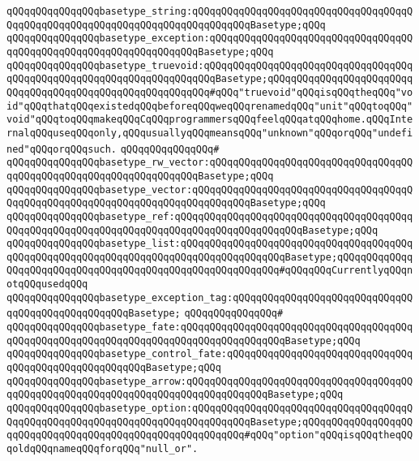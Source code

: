 \verb|qQQqqQQqqQQqqQQqbasetype_string:qQQqqQQqqQQqqQQqqQQqqQQqqQQqqQQqqQQqqQQqqQQqqQQqqQQqqQQqqQQqqQQqqQQqqQQqqQQqqQQqBasetype;qQQq|\newline
\verb|qQQqqQQqqQQqqQQqbasetype_exception:qQQqqQQqqQQqqQQqqQQqqQQqqQQqqQQqqQQqqQQqqQQqqQQqqQQqqQQqqQQqqQQqqQQqBasetype;qQQq|\newline
\verb|qQQqqQQqqQQqqQQqbasetype_truevoid:qQQqqQQqqQQqqQQqqQQqqQQqqQQqqQQqqQQqqQQqqQQqqQQqqQQqqQQqqQQqqQQqqQQqqQQqBasetype;qQQqqQQqqQQqqQQqqQQqqQQqqQQqqQQqqQQqqQQqqQQqqQQqqQQqqQQqqQQq#qQQq"truevoid"qQQqisqQQqtheqQQq"void"qQQqthatqQQqexistedqQQqbeforeqQQqweqQQqrenamedqQQq"unit"qQQqtoqQQq"void"qQQqtoqQQqmakeqQQqCqQQqprogrammersqQQqfeelqQQqatqQQqhome.qQQqInternalqQQquseqQQqonly,qQQqusuallyqQQqmeansqQQq"unknown"qQQqorqQQq"undefined"qQQqorqQQqsuch.|\newline
\verb|qQQqqQQqqQQqqQQq#|\newline
\verb|qQQqqQQqqQQqqQQqbasetype_rw_vector:qQQqqQQqqQQqqQQqqQQqqQQqqQQqqQQqqQQqqQQqqQQqqQQqqQQqqQQqqQQqqQQqqQQqBasetype;qQQq|\newline
\verb|qQQqqQQqqQQqqQQqbasetype_vector:qQQqqQQqqQQqqQQqqQQqqQQqqQQqqQQqqQQqqQQqqQQqqQQqqQQqqQQqqQQqqQQqqQQqqQQqqQQqqQQqBasetype;qQQq|\newline
\verb|qQQqqQQqqQQqqQQqbasetype_ref:qQQqqQQqqQQqqQQqqQQqqQQqqQQqqQQqqQQqqQQqqQQqqQQqqQQqqQQqqQQqqQQqqQQqqQQqqQQqqQQqqQQqqQQqqQQqBasetype;qQQq|\newline
\verb|qQQqqQQqqQQqqQQqbasetype_list:qQQqqQQqqQQqqQQqqQQqqQQqqQQqqQQqqQQqqQQqqQQqqQQqqQQqqQQqqQQqqQQqqQQqqQQqqQQqqQQqqQQqqQQqBasetype;qQQqqQQqqQQqqQQqqQQqqQQqqQQqqQQqqQQqqQQqqQQqqQQqqQQqqQQqqQQq#qQQqqQQqCurrentlyqQQqnotqQQqusedqQQq|\newline
\verb|qQQqqQQqqQQqqQQqbasetype_exception_tag:qQQqqQQqqQQqqQQqqQQqqQQqqQQqqQQqqQQqqQQqqQQqqQQqqQQqBasetype;|\newline
\verb|qQQqqQQqqQQqqQQq#|\newline
\verb|qQQqqQQqqQQqqQQqbasetype_fate:qQQqqQQqqQQqqQQqqQQqqQQqqQQqqQQqqQQqqQQqqQQqqQQqqQQqqQQqqQQqqQQqqQQqqQQqqQQqqQQqqQQqqQQqBasetype;qQQq|\newline
\verb|qQQqqQQqqQQqqQQqbasetype_control_fate:qQQqqQQqqQQqqQQqqQQqqQQqqQQqqQQqqQQqqQQqqQQqqQQqqQQqqQQqBasetype;qQQq|\newline
\verb|qQQqqQQqqQQqqQQqbasetype_arrow:qQQqqQQqqQQqqQQqqQQqqQQqqQQqqQQqqQQqqQQqqQQqqQQqqQQqqQQqqQQqqQQqqQQqqQQqqQQqqQQqqQQqBasetype;qQQq|\newline
\verb|qQQqqQQqqQQqqQQqbasetype_option:qQQqqQQqqQQqqQQqqQQqqQQqqQQqqQQqqQQqqQQqqQQqqQQqqQQqqQQqqQQqqQQqqQQqqQQqqQQqqQQqBasetype;qQQqqQQqqQQqqQQqqQQqqQQqqQQqqQQqqQQqqQQqqQQqqQQqqQQqqQQqqQQq#qQQq"option"qQQqisqQQqtheqQQqoldqQQqnameqQQqforqQQq"null_or".|\newline
